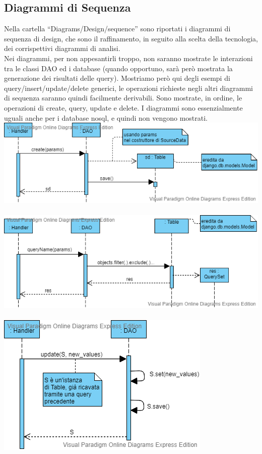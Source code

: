 \subsection{Diagrammi di Sequenza}
Nella cartella ``Diagrams/Design/sequence'' sono riportati i diagrammi di sequenza di design, che sono il raffinamento, in seguito alla scelta della tecnologia, dei corrispettivi diagrammi di analisi.\\
Nei diagrammi, per non appesantirli troppo, non saranno mostrate le interazioni tra le classi DAO ed i database (quando opportuno, sarà però mostrata la generazione dei risultati delle query). Mostriamo però qui degli esempi di query/insert/update/delete generici, le operazioni richieste negli altri diagrammi di sequenza saranno quindi facilmente derivabili. Sono mostrate, in ordine, le operazioni di create, query, update e delete. I diagrammi sono essenzialmente uguali anche per i database nosql, e quindi non vengono mostrati.\\
\includegraphics[scale=0.7]{../Contents/Diagrams/Design/sequence/DAO/create.png}\\ \\
\includegraphics[scale=0.7]{../Contents/Diagrams/Design/sequence/DAO/query.png}\\ \\
\includegraphics[scale=0.7]{../Contents/Diagrams/Design/sequence/DAO/update.png}\\ \\
